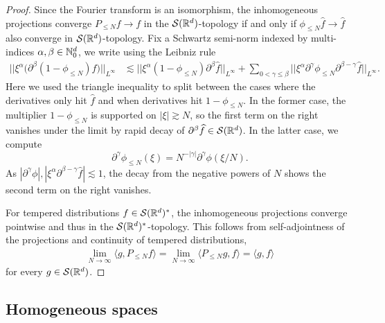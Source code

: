 \begin{proof}
	Since the Fourier transform is an isomorphism, the inhomogeneous projections converge $P_{\leq N} f \to f$ in the $\mathcal S (\mathbb R^d)$-topology if and only if $\phi_{\leq N} \widehat f \to \widehat f$ also converge in $\mathcal S (\mathbb R^d)$-topology. Fix a Schwartz semi-norm indexed by multi-indices $\alpha, \beta \in \mathbb N^d_0$, we write using the Leibniz rule
		\begin{align*}
			 ||\xi^\alpha \Big( \partial^\beta (1 - \phi_{\leq N}) \widehat f \Big) ||_{L^\infty}
			 	&\lesssim ||\xi^\alpha (1 - \phi_{\leq N})\partial^\beta \widehat f||_{L^\infty} +  \sum_{0 < \gamma \leq \beta}||\xi^\alpha \partial^{\gamma}  \phi_{\leq N} \partial^{\beta - \gamma} \widehat f ||_{L^\infty} .
		\end{align*}	 
	Here we used the triangle inequality to split between the cases where the derivatives only hit $\widehat f$ and when derivatives hit $1 - \phi_{\leq N}$. In the former case, the multiplier $1 - \phi_{\leq N}$ is supported on $|\xi| \gtrsim N$, so the first term on the right vanishes under the limit by rapid decay of $\partial^\beta \widehat f \in \mathcal S (\mathbb R^d)$. In the latter case, we compute
		\[ \partial^\gamma \phi_{\leq N} (\xi) = N^{-|\gamma|} \partial^\gamma \phi (\xi/N). \]
	As $|\partial^\gamma \phi|, |\xi^\alpha \partial^{\beta - \gamma} \widehat f| \lesssim 1$, the decay from the negative powers of $N$ shows the second term on the right vanishes.
	
	For tempered distributions $f \in \mathcal S (\mathbb R^d)^*$, the inhomogeneous projections converge pointwise and thus in the $\mathcal S (\mathbb R^d)^*$-topology. This follows from self-adjointness of the projections and continuity of tempered distributions, 
		\begin{align*}
			\lim_{N \to \infty}\langle  g, P_{\leq N} f \rangle = \lim_{N \to \infty} \langle P_{\leq N} g, f \rangle = \langle g, f \rangle
		\end{align*}
	for every $g \in \mathcal S (\mathbb R^d)$. 
\end{proof}

\subsection{Homogeneous spaces}

